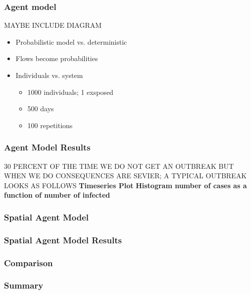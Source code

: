 \documentclass[30pt]{beamer}
\begin{document}
\begin{frame}
\frametitle{Agent model}
MAYBE INCLUDE DIAGRAM
\begin{itemize}
\item Probabilistic model vs. deterministic
\item Flows become probabilities
\item Individuals vs. system
\begin{itemize}
\item 1000 individuals; 1 exsposed
\item 500 days
\item 100 repetitions
\end{itemize}
\end{itemize}
\end{frame}

\begin{frame}
\frametitle{Agent Model Results}
30 PERCENT OF THE TIME WE DO NOT GET AN OUTBREAK BUT WHEN WE DO CONSEQUENCES ARE SEVIER; A TYPICAL OUTBREAK LOOKS AS FOLLOWS
\textbf{Timeseries Plot}
\textbf{Histogram number of cases as a function of number of infected}
\end{frame}

\begin{frame}
\frametitle{Spatial Agent Model}
\end{frame}


\begin{frame}
\frametitle{Spatial Agent Model Results}
\end{frame}

\begin{frame}
\frametitle{Comparison}
\end{frame}

\begin{frame}
\frametitle{Summary}
\end{frame}
\end{document}
